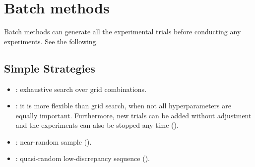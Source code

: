 \documentclass[letterpaper,10pt,english]{sphinxmanual}
\begin{document}
\begin{sphinxVerbatim}[commandchars=\\\{\}]
  
   
    

              
                     
 
\end{sphinxVerbatim}


\section{Batch methods}
\label{\detokenize{pybatdoe:batch-methods}}\label{\detokenize{pybatdoe::doc}}
Batch methods can generate all the experimental trials before conducting any experiments. See the following.


\subsection{Simple Strategies}
\label{\detokenize{pybatdoe:simple-strategies}}\begin{itemize}
\item {} 
: exhaustive search over grid combinations.

\item {} 
: it is more flexible than grid search, when not all hyperparameters are equally important. Furthermore, new trials can be added without adjustment and the experiments can also be stopped any time ().

\item {} 
: near-random sample ().

\item {} 
: quasi-random low-discrepancy sequence ().

\end{itemize}
\end{document}
